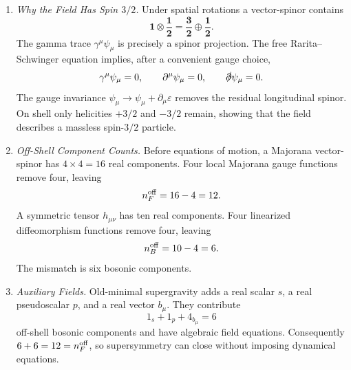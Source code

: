 \begin{enumerate}
  \begin{enumerate}
    \item \emph{Why the Field Has Spin \(3/2\).}
    Under spatial rotations a vector-spinor contains
      \[
        \mathbf{1}\otimes\mathbf{\frac12}
          =\mathbf{\frac32}\oplus\mathbf{\frac12}.
      \]
      The gamma trace \(\gamma^\mu\psi_\mu\) is precisely a spinor projection.
      The free Rarita--Schwinger equation implies, after a convenient gauge
      choice,
      \[
        \gamma^\mu\psi_\mu=0,\qquad
        \partial^\mu\psi_\mu=0,\qquad
        \slashed\partial\psi_\mu=0 .
      \]
      The gauge invariance
      \(\psi_\mu\to\psi_\mu+\partial_\mu\varepsilon\) removes the residual
      longitudinal spinor.  On shell only helicities
      \(+3/2\) and \(-3/2\) remain, showing that the field describes a
      massless spin-\(3/2\) particle.
    \item \emph{Off-Shell Component Counts.}
    Before equations of motion, a Majorana vector-spinor has
      \(4\times4=16\) real components.  Four local Majorana gauge functions
      remove four, leaving
      \[
        n_F^{\rm off}=16-4=12.
      \]
      A symmetric tensor \(h_{\mu\nu}\) has ten real components.
      Four linearized diffeomorphism functions remove four, leaving
      \[
        n_B^{\rm off}=10-4=6.
      \]
      The mismatch is six bosonic components.
    \item \emph{Auxiliary Fields.}
    Old-minimal supergravity adds a real scalar \(s\), a real pseudoscalar
      \(p\), and a real vector \(b_\mu\).  They contribute
      \[
        1_s+1_p+4_{b_\mu}=6
      \]
      off-shell bosonic components and have algebraic field equations.
      Consequently
      \(6+6=12=n_F^{\rm off}\), so supersymmetry can close without imposing
      dynamical equations.
  \end{enumerate}


\end{enumerate}
